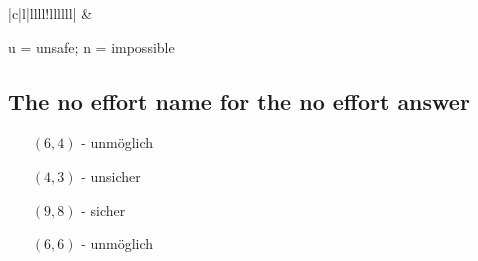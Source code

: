 \documentclass[a4paper, 11pt]{article}
\begin{document}
\begin{table}[h!]
{\begin{tabular}{|c|l|llll!{\color[rgb]{0,0.902,0}\vrule}llllll|}
      \hline
                        &                                                                                                                                                                                                                                                                                                                                                                                                                                                      \\
      \hline
      \end{tabular}}
      \end{table}
      u = unsafe; n = impossible

      \subsection{The no effort name for the no effort answer}
      \begin{itemize}[leftmargin=\parindent+.28in]
            \item[$(6,4)$ -] unmöglich
            \item[$(4,3)$ -] unsicher
            \item[$(9,8)$ -] sicher
            \item[$(6,6)$ -] unmöglich
      \end{itemize}
      \newpage
      
\end{document}
